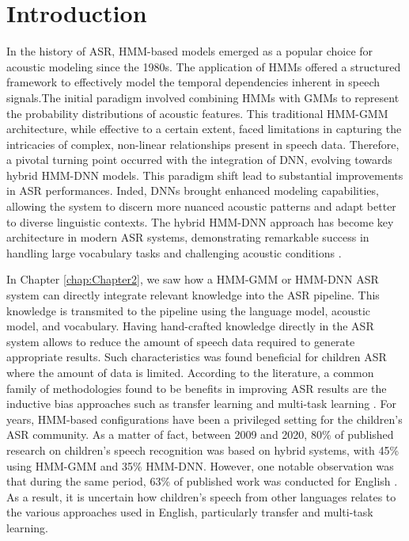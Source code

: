 \label{chap:Chapter3}
\cleardoublepage
\section{Introduction}
In the history of ASR, HMM-based models emerged as a popular choice for acoustic modeling since the 1980s. The application of HMMs offered a structured framework to effectively model the temporal dependencies inherent in speech signals.The initial paradigm involved combining HMMs with GMMs to represent the probability distributions of acoustic features. This traditional HMM-GMM architecture, while effective to a certain extent, faced limitations in capturing the intricacies of complex, non-linear relationships present in speech data. Therefore, a pivotal turning point occurred with the integration of DNN, evolving towards hybrid HMM-DNN models. This paradigm shift lead to substantial improvements in ASR performances. Inded, DNNs brought enhanced modeling capabilities, allowing the system to discern more nuanced acoustic patterns and adapt better to diverse linguistic contexts. The hybrid HMM-DNN approach has become key architecture in modern ASR systems, demonstrating remarkable success in handling large vocabulary tasks and challenging acoustic conditions \cite{hmm-dnn}. 

In Chapter \ref{chap:Chapter2}, we saw how a HMM-GMM or HMM-DNN ASR system can directly integrate relevant knowledge into the ASR pipeline. This knowledge is transmited to the pipeline using the language model, acoustic model, and vocabulary. Having hand-crafted knowledge directly in the ASR system allows to reduce the amount of speech data required to generate appropriate results. Such characteristics was found beneficial for children ASR where the amount of data is limited. According to the literature, a common family of methodologies  found to be benefits in improving ASR results are the inductive bias approaches such as transfer learning and multi-task learning \cite{TransferLF}. For years, HMM-based configurations have been a privileged setting for the children's ASR community. As a matter of fact, between 2009 and 2020, 80\% of published research on children's speech recognition was based on hybrid systems, with 45\% using HMM-GMM and 35\% HMM-DNN. However, one notable observation was that during the same period, 63\% of published work was conducted for English \cite{big_review_childASR}. As a result, it is uncertain how children's speech from other languages relates to the various approaches used in English, particularly transfer and multi-task learning.

